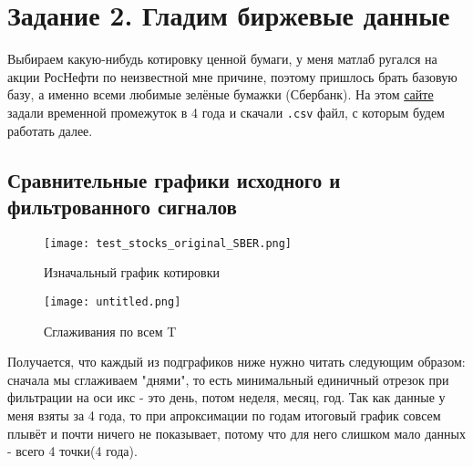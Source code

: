 \chapter{Задание 2. Гладим биржевые данные}
\label{ch:chap3}



\lstset{style=mystyle}

Выбираем какую-нибудь котировку ценной бумаги, у меня матлаб ругался на акции РосНефти по неизвестной мне причине, поэтому пришлось брать базовую базу, а именно всеми любимые зелёные бумажки (Сбербанк).
На этом \href{https://drive.google.com/drive/folders/1o8ozGv-bwYWuNpUlfYqM3rDu85QSQ0JW}{сайте} задали временной промежуток в 4 года и скачали \texttt{.csv} файл, с которым будем работать далее.

\section{Сравнительные графики исходного и фильтрованного сигналов}

\begin{figure}[ht]
    \centering
    \texttt{[image: test\_stocks\_original\_SBER.png]}
    \caption{Изначальный график котировки}
\end{figure}

\begin{figure}[ht]
    \centering
    \texttt{[image: untitled.png]}
    \caption{Сглаживания по всем T}
\end{figure}


Получается, что каждый из подграфиков ниже нужно читать следующим образом: сначала мы сглаживаем "днями", то есть минимальный единичный отрезок при фильтрации на оси икс - это день, потом неделя, месяц, год. 
Так как данные у меня взяты за 4 года, то при апроксимации по годам итоговый график совсем плывёт и почти ничего не показывает, потому что для него слишком мало данных - всего 4 точки(4 года).

\endinput